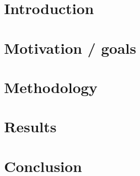 \section{Introduction}


\section{Motivation / goals}


\section{Methodology}


\section{Results}


\section{Conclusion}


